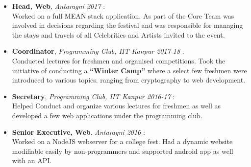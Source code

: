 
\begin{itemize}
\item \textbf{Head, Web}, \emph{Antaragni 2017}
\ifdefined\ONEPAGE
\else
  : \\
  Worked on a full MEAN stack application. As part of the Core Team was involved
  in decisions regarding the festival and was responsible for managing the stays
  and travels of all Celebrities and Artists invited to the event.
\fi
\item \textbf{Coordinator}, \emph{Programming Club, IIT Kanpur 2017-18}
\ifdefined\ONEPAGE
\else
  : \\
  Conducted lectures for freshmen and organised competitions. Took the
  initiative of conducting a \textbf{``Winter Camp''} where a select few
  freshmen were introduced to various topics.
  ranging from cryptography to web development.
\fi

\ifdefined\ONEPAGE
\else
\item \textbf{Secretary}, \emph{Programming Club, IIT Kanpur 2016-17}
  : \\
  Helped Conduct and organize various lectures for freshmen as well as developed
  a few web applications under the programming club.
\item \textbf{Senior Executive, Web}, \emph{Antaragni 2016}
  : \\
  Worked on a NodeJS webserver for a college fest. Had a dynamic website
  modifiable easily by non-programmers and supported android app as well with an
  API.
\fi
\end{itemize}
\vspace{-2mm}
